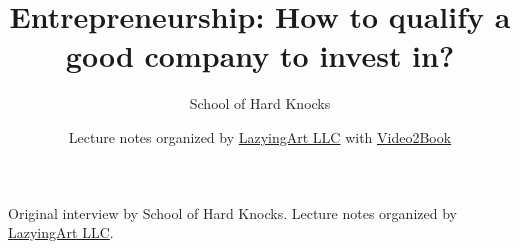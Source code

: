 \documentclass[11pt,oneside]{book}
\begin{document}
\frontmatter
\title{Entrepreneurship: How to qualify a good company to invest in?}
\author{School of Hard Knocks}
\date{Lecture notes organized by \href{https://lazying.art}{LazyingArt LLC} with \href{https://github.com/lachlanchen/Video2Book}{Video2Book}}
\maketitle
\begin{center}
\small Original interview by School of Hard Knocks. Lecture notes organized by \href{https://lazying.art}{LazyingArt LLC}.
\end{center}
\clearpage
\mainmatter

\end{document}
